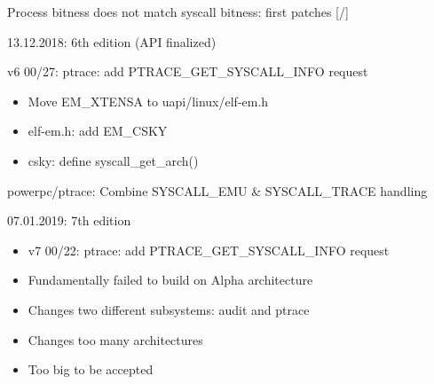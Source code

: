 \documentclass[unicode,aspectratio=169]{beamer}
\begin{document}
\begin{frame}{Process bitness does not match syscall bitness: first patches \hfill [\insertframenumber/\inserttotalframenumber]}
\large
\begin{block}{13.12.2018: 6th edition (API finalized)}
\begin{itemize}
	\item v6 00/27: ptrace: add PTRACE\_GET\_SYSCALL\_INFO request
	{\bf
	\begin{itemize}
		\item Move EM\_XTENSA to uapi/linux/elf-em.h
		\item elf-em.h: add EM\_CSKY
		\item csky: define syscall\_get\_arch()
	\end{itemize}
	\item powerpc/ptrace: Combine SYSCALL\_EMU \& SYSCALL\_TRACE handling
	}
\end{itemize}
\end{block}

\begin{block}{07.01.2019: 7th edition}
\begin{itemize}
	\item v7 00/22: ptrace: add PTRACE\_GET\_SYSCALL\_INFO request
	\item Fundamentally failed to build on Alpha architecture
	\item Changes two different subsystems: audit and ptrace
	\item Changes too many architectures
	\item Too big to be accepted
\end{itemize}
\end{block}
\end{frame}
\end{document}
